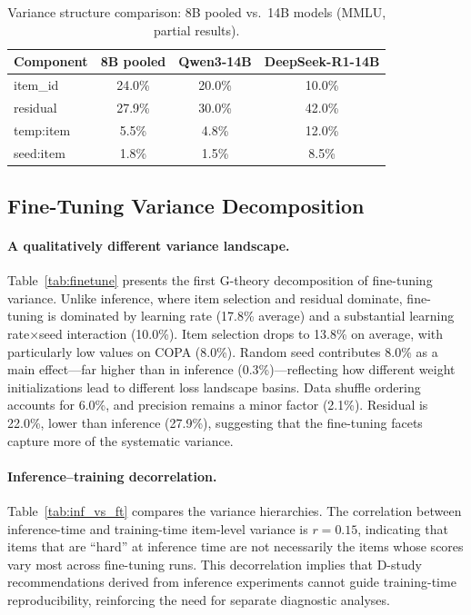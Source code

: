 \documentclass[letterpaper]{article}
\begin{document}
\begin{table}[t]
\centering
\caption{Variance structure comparison: 8B pooled vs.\ 14B models (MMLU, partial results).}
\label{tab:14b}
\small
\begin{tabular}{lccc}
\toprule
Component & 8B pooled & Qwen3-14B & DeepSeek-R1-14B \\
\midrule
item\_id    & 24.0\% & 20.0\% & 10.0\% \\
residual    & 27.9\% & 30.0\% & 42.0\% \\
temp:item   &  5.5\% &  4.8\% & 12.0\% \\
seed:item   &  1.8\% &  1.5\% &  8.5\% \\
\bottomrule
\end{tabular}
\end{table}


\subsection{Fine-Tuning Variance Decomposition}

\paragraph{A qualitatively different variance landscape.}
Table~\ref{tab:finetune} presents the first G-theory decomposition of fine-tuning variance.
Unlike inference, where item selection and residual dominate, fine-tuning is dominated by learning rate (17.8\% average) and a substantial learning rate$\times$seed interaction (10.0\%).
Item selection drops to 13.8\% on average, with particularly low values on COPA (8.0\%).
Random seed contributes 8.0\% as a main effect---far higher than in inference (0.3\%)---reflecting how different weight initializations lead to different loss landscape basins.
Data shuffle ordering accounts for 6.0\%, and precision remains a minor factor (2.1\%).
Residual is 22.0\%, lower than inference (27.9\%), suggesting that the fine-tuning facets capture more of the systematic variance.

\paragraph{Inference--training decorrelation.}
Table~\ref{tab:inf_vs_ft} compares the variance hierarchies.
The correlation between inference-time and training-time item-level variance is $r=0.15$, indicating that items that are ``hard'' at inference time are not necessarily the items whose scores vary most across fine-tuning runs.
This decorrelation implies that D-study recommendations derived from inference experiments cannot guide training-time reproducibility, reinforcing the need for separate diagnostic analyses.
\end{document}
